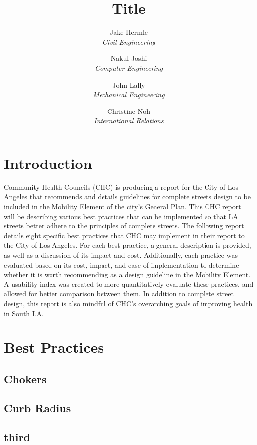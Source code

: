 \documentclass[titlepage]{article}
\title{Title}
\author{
	Jake Hermle\\ \emph{Civil Engineering} \and
	Nakul Joshi\\ \emph{Computer Engineering} \and
	John Lally\\ \emph{Mechanical Engineering}\and
	Christine Noh\\ \emph{International Relations}
}
\begin{document}
\maketitle

\begin{abstract}

\end{abstract}

\tableofcontents
\newpage
\listoffigures
\newpage
\listoftables
\newpage



\section{Introduction}

Community Health Councils (CHC) is producing a report for the City of Los Angeles that recommends and details guidelines for complete streets design to be included in the Mobility Element of the city’s General Plan. This CHC report will be describing various best practices that can be implemented so that LA streets better adhere to the principles of complete streets. The following report details eight specific best practices that CHC may implement in their report to the City of Los Angeles. For each best practice, a general description is provided, as well as a discussion of its impact and cost. Additionally, each practice was evaluated based on its cost, impact, and ease of implementation to determine whether it is worth recommending as a design guideline in the Mobility Element. A usability index was created to more quantitatively evaluate these practices, and allowed for better comparison between them. In addition to complete street design, this report is also mindful of CHC’s overarching goals of improving health in South LA.

\newpage

\section{Best Practices}
	\subsection{Chokers} 
	\subsection{Curb Radius}
	
	\subsection{third}
\end{document}
